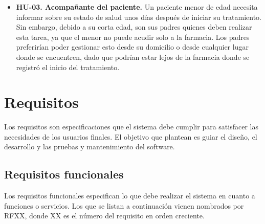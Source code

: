 \begin{itemize}
	\item \textbf{HU-03. Acompañante del paciente.} Un paciente menor de edad necesita informar sobre su estado de salud unos días después de iniciar su tratamiento. Sin embargo, debido a su corta edad, son sus padres quienes deben realizar esta tarea, ya que el menor no puede acudir solo a la farmacia. Los padres preferirían poder gestionar esto desde su domicilio o desde cualquier lugar donde se encuentren, dado que podrían estar lejos de la farmacia donde se registró el inicio del tratamiento.

\end{itemize}


\section{Requisitos}
Los requisitos son especificaciones que el sistema debe cumplir para satisfacer las necesidades de los usuarios finales. El objetivo que plantean es guiar el diseño, el desarrollo y las pruebas y mantenimiento del software. 

\subsection{Requisitos funcionales}
Los requisitos funcionales especifican lo que debe realizar el sistema en cuanto a funciones o servicios. Los que se listan a continuación vienen nombrados por RFXX, donde XX es el número del requisito en orden creciente.

